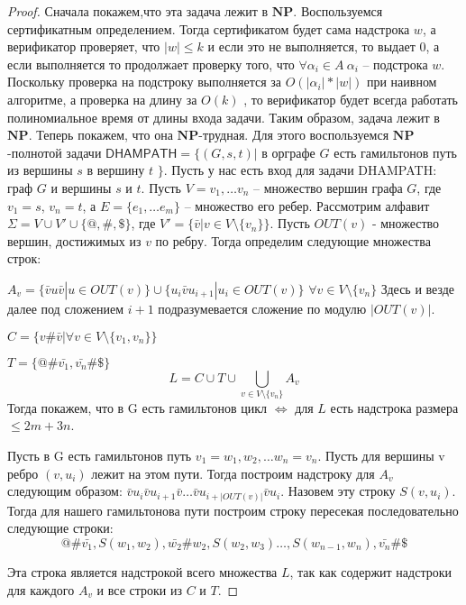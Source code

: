 \documentclass{article}
\begin{document}
\begin{proof}

Сначала покажем,что эта задача лежит в $\mathbf{NP}$. Воспользуемся сертификатным определением.
Тогда сертификатом будет сама надстрока $w$, а верификатор проверяет, что $|w| \leq k$ и если это не выполняется, то выдает 0, а если выполняется то продолжает проверку того, что $\forall \alpha_i \in A\ \alpha_i $ -- подстрока $w$. Поскольку проверка на подстроку выполняется за $O(|\alpha_i|*|w|)$ при наивном алгоритме, а проверка на длину за $O(k)$ , то верификатор будет всегда работать полиномиальное время от длины входа задачи. Таким образом, задача лежит в $\mathbf{NP}$.
Теперь покажем, что она $\mathbf{NP}$-трудная. Для этого воспользуемся $\mathbf{NP}$-полнотой задачи $\mathsf{DHAMPATH} =\{(G,s,t) | $ в орграфе $G$ есть гамильтонов путь из вершины $s$ в вершину $t$ $ \}$.
Пусть у нас есть вход для задачи \textsf{DHAMPATH}: граф $G$ и вершины $s$ и $t$. Пусть $V={v_1, \ldots v_n}$
-- множество вершин графа $G$, где $v_1 = s$, $v_n = t$, а $E=\{ e_1, \ldots e_m\}$ -- множество его ребер.
Рассмотрим алфавит $\Sigma=V \cup V' \cup \{@,\#,\$\}$, где $V' = \{\bar{v} | v \in V \setminus \{v_n\} \}$.
Пусть $OUT(v)$ - множество вершин, достижимых из $v$ по ребру.
Тогда определим следующие множества строк:

 $A_v = \{\bar{v}u\bar{v} | u \in OUT(v)\} \cup \{u_i\bar{v}u_{i+1} | u_i \in OUT(v)\}$ $\forall v \in V \setminus \{v_n\} $ Здесь и везде далее под сложением $i+1$ подразумевается сложение по модулю $|OUT(v)|$. 
 
 $C = \{ v\#\bar{v} | \forall v \in V \setminus \{v_1,v_n\} \} $
 
 $T = \{ @\#\bar{v_1},\bar{v_n}\#\$ \} $
 $$L = C \cup T \cup \bigcup_{v \in V \setminus \{v_n\}} A_v$$
 Тогда покажем, что в G есть гамильтонов цикл $\Leftrightarrow$ для $L$ есть надстрока размера $\leq 2m+3n$.
 
 Пусть в G есть гамильтонов путь $v_1 = w_1,w_2, \ldots w_n = v_n$. Пусть для вершины v ребро $(v,u_i)$ лежит на этом пути. Тогда построим надстроку для $A_v$ следующим образом: $\bar{v}u_i\bar{v}u_{i+1}\bar{v} \ldots \bar{v}u_{i+|OUT(v)|}\bar{v}u_i$. Назовем эту строку $S(v,u_i)$.
 Тогда для нашего гамильтонова пути построим строку пересекая последовательно следующие строки:
 $$@\#\bar{v_1}, S(w_1,w_2), \bar{w_2}\#w_2, S(w_2,w_3) \ldots ,S(w_{n-1},w_n), \bar{v_n}\#\$ $$
 
 Эта строка является надстрокой всего множества $L$, так как содержит надстроки для каждого $A_v$ и все строки из $C$ и $T$.
 

\end{proof}
\end{document}
